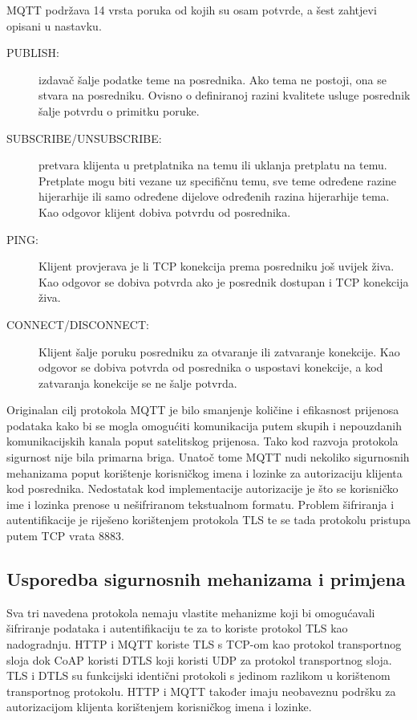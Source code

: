 \documentclass[times, utf8, diplomski]{fer}
\begin{document}
MQTT podržava 14 vrsta poruka od kojih su osam potvrde, a šest zahtjevi opisani u nastavku.
\begin{description}
    \item[PUBLISH:]izdavač šalje podatke teme na posrednika. Ako tema ne postoji, ona se stvara na posredniku. Ovisno o definiranoj razini kvalitete usluge posrednik šalje potvrdu o primitku poruke.
    \item[SUBSCRIBE/UNSUBSCRIBE:]pretvara klijenta u pretplatnika na temu ili uklanja pretplatu na temu. Pretplate mogu biti vezane uz specifičnu temu, sve teme određene razine hijerarhije ili samo određene dijelove određenih razina hijerarhije tema. Kao odgovor klijent dobiva potvrdu od posrednika.
    \item[PING:] Klijent provjerava je li TCP konekcija prema posredniku još uvijek živa. Kao odgovor se dobiva potvrda ako je posrednik dostupan i TCP konekcija živa.
    \item[CONNECT/DISCONNECT:] Klijent šalje poruku posredniku za otvaranje ili zatvaranje konekcije. Kao odgovor se dobiva potvrda od posrednika o uspostavi konekcije, a kod zatvaranja konekcije se ne šalje potvrda.
\end{description}

Originalan cilj protokola MQTT je bilo smanjenje količine i efikasnost prijenosa podataka kako bi se mogla omogućiti komunikacija putem skupih i nepouzdanih komunikacijskih kanala poput satelitskog prijenosa. Tako kod razvoja protokola sigurnost nije bila primarna briga. Unatoč tome MQTT nudi nekoliko sigurnosnih mehanizama poput korištenje korisničkog imena i lozinke za autorizaciju klijenta kod posrednika. Nedostatak kod implementacije autorizacije je što se korisničko ime i lozinka prenose u nešifriranom tekstualnom formatu. Problem šifriranja i autentifikacije je riješeno korištenjem protokola TLS te se tada protokolu pristupa putem TCP vrata 8883. 

\subsection{Usporedba sigurnosnih mehanizama i primjena}
Sva tri navedena protokola nemaju vlastite mehanizme koji bi omogućavali šifriranje podataka i autentifikaciju te za to koriste protokol TLS kao nadogradnju. HTTP i MQTT koriste TLS s TCP-om kao protokol transportnog sloja dok CoAP koristi DTLS koji koristi UDP za protokol transportnog sloja. TLS i DTLS su funkcijski identični protokoli s jedinom razlikom u korištenom transportnog protokolu. HTTP i MQTT također imaju neobaveznu podršku za autorizacijom klijenta korištenjem korisničkog imena i lozinke.
\end{document}
